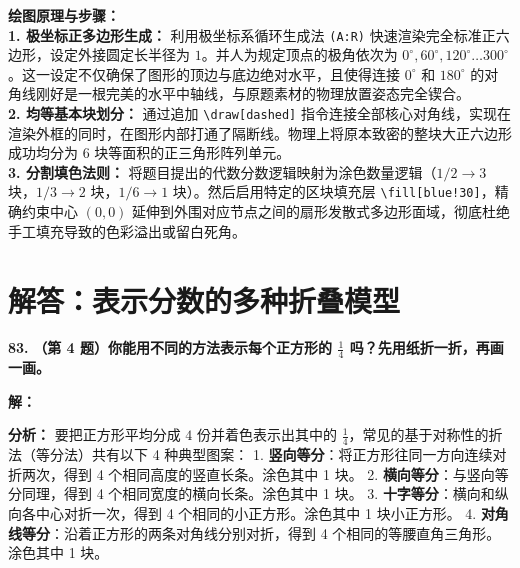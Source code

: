 \vspace{0.4cm}
{\small\color{blue!70!black}
\textbf{绘图原理与步骤：}\\
\textbf{1. 极坐标正多边形生成：} 利用极坐标系循环生成法 \texttt{(A:R)} 快速渲染完全标准正六边形，设定外接圆定长半径为 $1$。并人为规定顶点的极角依次为 $0^\circ, 60^\circ, 120^\circ \dots 300^\circ$。这一设定不仅确保了图形的顶边与底边绝对水平，且使得连接 $0^\circ$ 和 $180^\circ$ 的对角线刚好是一根完美的水平中轴线，与原题素材的物理放置姿态完全锲合。\\
\textbf{2. 均等基本块划分：} 通过追加 \texttt{\textbackslash draw[dashed]} 指令连接全部核心对角线，实现在渲染外框的同时，在图形内部打通了隔断线。物理上将原本致密的整块大正六边形成功均分为 $6$ 块等面积的正三角形阵列单元。\\
\textbf{3. 分割填色法则：} 将题目提出的代数分数逻辑映射为涂色数量逻辑（$1/2\to 3$ 块，$1/3\to 2$ 块，$1/6\to 1$ 块）。然后启用特定的区块填充层 \texttt{\textbackslash fill[blue!30]}，精确约束中心 $(0,0)$ 延伸到外围对应节点之间的扇形发散式多边形面域，彻底杜绝手工填充导致的色彩溢出或留白死角。
}

\newpage



\section{解答：表示分数的多种折叠模型}

\vspace{0.6cm}

\textbf{\LARGE 83.} \textbf{（第 4 题）你能用不同的方法表示每个正方形的 $\displaystyle\frac{1}{4}$ 吗？先用纸折一折，再画一画。}

\vspace{0.4cm}
\textbf{解：}

\textbf{分析：}
要把正方形平均分成 $4$ 份并着色表示出其中的 $\displaystyle\frac{1}{4}$，常见的基于对称性的折法（等分法）共有以下 4 种典型图案：
1. \textbf{竖向等分}：将正方形往同一方向连续对折两次，得到 4 个相同高度的竖直长条。涂色其中 1 块。
2. \textbf{横向等分}：与竖向等分同理，得到 4 个相同宽度的横向长条。涂色其中 1 块。
3. \textbf{十字等分}：横向和纵向各中心对折一次，得到 4 个相同的小正方形。涂色其中 1 块小正方形。
4. \textbf{对角线等分}：沿着正方形的两条对角线分别对折，得到 4 个相同的等腰直角三角形。涂色其中 1 块。


